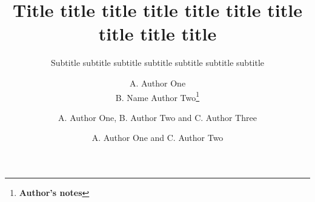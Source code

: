\title{Title title title title title title title title title title} %
\subtitle{Subtitle subtitle subtitle subtitle subtitle subtitle subtitle}






\author{A. Author One\\ B. Name Author Two\thanks{{\bf Author's notes}}}


\author{A. Author One, B. Author Two and C. Author Three}

\author{A. Author One and C. Author Two}

\maketitle                   %
